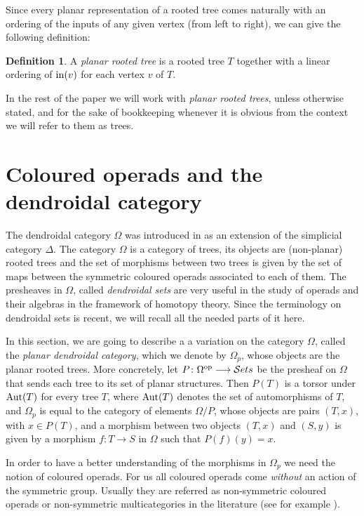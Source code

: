 \documentclass[a4paper]{amsart}
\theoremstyle{plain}
\theoremstyle{definition}
\newtheorem{dfn}[thm]{Definition}
\theoremstyle{remark}
\newcommand{\rpd}{\Omega_p}
\numberwithin{equation}{section}
\numberwithin{figure}{section}
\begin{document}
Since every planar representation of a rooted tree
comes naturally with an ordering of the inputs of any given vertex
(from left to right), we can give the following definition:

\begin{dfn}
A \emph{planar rooted tree} is a rooted tree $T$ together with a linear ordering of
$\operatorname{in}(v)$ for each vertex $v$ of $T$.
\end{dfn}

In the rest of the paper we will work with \emph{planar rooted trees}, unless otherwise stated, and for the sake of
bookkeeping whenever it is obvious from the context we will refer to them as trees.

\section{Coloured operads and the dendroidal category}
The dendroidal category $\Omega$ was introduced in \cite{Wei07,
moerdijkweiss} as an extension of the simplicial category $\Delta$.
The category $\Omega$ is a category of trees, its objects are
(non-planar) rooted trees and the set of morphisms between two trees
is given by the set of maps between the symmetric coloured operads
associated to each of them. The presheaves in $\Omega$, called
\emph{dendroidal sets} are very useful in the study of operads and
their algebras in the framework of homotopy theory. Since the
terminology on dendroidal sets is  recent, we will recall all the
needed parts of it here.

In this section, we are going to describe a a variation on the
category $\Omega$, called the \emph{planar dendroidal category},
which we denote by $\rpd$, whose objects are the planar rooted
trees. More concretely, let $P\colon \Omega^{\rm op}\longrightarrow
\mathcal{S}ets$ be the presheaf on $\Omega$ that sends each tree to
its set of planar structures. Then $P(T)$ is a torsor under ${\rm
Aut}(T)$ for every tree $T$, where ${\rm Aut}(T)$ denotes the set of
automorphisms of $T$, and $\rpd$ is equal to the category of
elements $\Omega/P$, whose objects are pairs $(T, x)$, with $x\in
P(T)$, and a morphism between two objects $(T,x)$ and $(S,y)$ is
given by a morphism $f\colon T\longrightarrow S$ in $\Omega$ such
that $P(f)(y)=x$.

In order to have a better understanding of the morphisms in $\rpd$ we need the notion of
coloured operads. For us all coloured operads come \emph{without} an
action of the symmetric group. Usually they are referred as
non-symmetric coloured operads or non-symmetric multicategories in
the literature (see for example \cite{bergermoerdijk, markl}).
\end{document}
